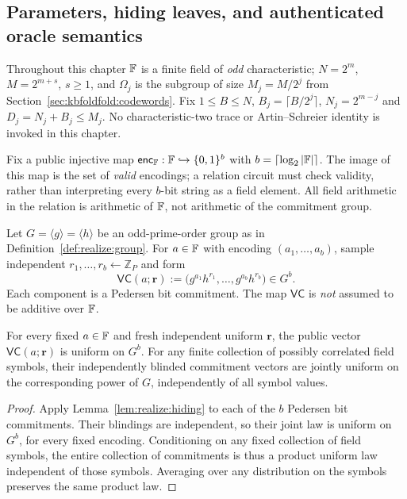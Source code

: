 \subsection{Parameters, hiding leaves, and authenticated oracle semantics}\label{sec:full:oracles}

Throughout this chapter $\mathbb{F}$ is a finite field of \emph{odd}
characteristic; $N=2^m$, $M=2^{m+s}$, $s\geq1$,
and $\Omega_j$ is the subgroup of size $M_j=M/2^j$
from Section~\ref{sec:kbfoldfold:codewords}.
Fix $1\leq B\leq N$, $B_j=\lceil B/2^j\rceil$,
$N_j=2^{m-j}$ and $D_j=N_j+B_j\leq M_j$.
No characteristic-two trace or Artin--Schreier
identity is invoked in this chapter.

\begin{definition}\label{def:full:field-encoding}
Fix a public injective map
$\mathsf{enc}_{\mathbb{F}}:\mathbb{F}\hookrightarrow\{0,1\}^b$
with $b=\lceil\log_2|\mathbb{F}|\rceil$.
The image of this map is the set of \emph{valid}
encodings; a relation circuit must check validity,
rather than interpreting every $b$-bit string as
a field element. All field arithmetic in the
relation is arithmetic of $\mathbb{F}$, not arithmetic
of the commitment group.
\end{definition}

\begin{definition}\label{def:full:symbol-commit}
Let $G=\langle g\rangle=\langle h\rangle$
be an odd-prime-order group as in
Definition~\ref{def:realize:group}.
For $a\in\mathbb{F}$ with encoding
$(a_1,\ldots,a_b)$, sample independent
$r_1,\ldots,r_b\leftarrow\mathbb Z_P$
and form
\[
 \mathsf{VC}(a;\mathbf r)
   :=\bigl(g^{a_1}h^{r_1},\ldots,
            g^{a_b}h^{r_b}\bigr)\in G^b.
\]
Each component is a Pedersen bit commitment.
The map $\mathsf{VC}$ is \emph{not}
assumed to be additive over $\mathbb{F}$.
\end{definition}

\begin{lemma}\label{lem:full:leaf-uniform}
For every fixed $a\in\mathbb{F}$ and fresh independent
uniform $\mathbf r$, the public vector
$\mathsf{VC}(a;\mathbf r)$ is uniform on $G^b$.
For any finite collection of possibly correlated
field symbols, their independently blinded
commitment vectors are jointly uniform on the
corresponding power of $G$, independently of
all symbol values.
\end{lemma}
\begin{proof}
Apply Lemma~\ref{lem:realize:hiding}
to each of the $b$ Pedersen bit commitments.
Their blindings are independent, so their
joint law is uniform on $G^b$, for every
fixed encoding. Conditioning on any fixed
collection of field symbols, the entire
collection of commitments is thus a product
uniform law independent of those symbols.
Averaging over any distribution on the
symbols preserves the same product law.
\end{proof}

